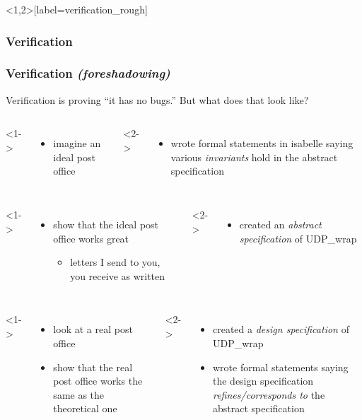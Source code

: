 \documentclass{beamer}
\begin{document}
\begin{frame}<1,2>[label=verification_rough]
\frametitle<1,3>{Verification}
\frametitle<2>{Verification \textit{(foreshadowing)}}

Verification is proving ``it has no bugs.''
But what does that look like?

    \begin{columns}[t]
        <1->
        \begin{itemize}
            \item imagine an ideal post office
        \end{itemize}
        <2->
        \begin{itemize}
            \item wrote formal statements in isabelle saying various \alert<2>{\it invariants} hold in the abstract specification
        \end{itemize}
    \end{columns}
    
    \begin{columns}[t]
        <1->
        \begin{itemize}
            \item show that the ideal post office works great
            \begin{itemize}
                \item letters I send to you, you receive as written
            \end{itemize}
        \end{itemize}
        <2->
        \begin{itemize}
            \item created an \alert<2>{\it abstract specification} of UDP\_wrap
        \end{itemize}
    \end{columns}

    \begin{columns}[t]
        <1->
        \begin{itemize}
            \item look at a real post office
            \vspace{\baselineskip}\\
            \item show that the real post office works the same as the theoretical one
        \end{itemize}
        
        <2->
        \begin{itemize}
            \item created a \alert<2>{\it design specification} of UDP\_wrap
            \item wrote formal statements saying the design specification \alert<2>{\it refines/corresponds to} the abstract specification
        \end{itemize}
    
    \end{columns}
    
\end{frame}
\end{document}
